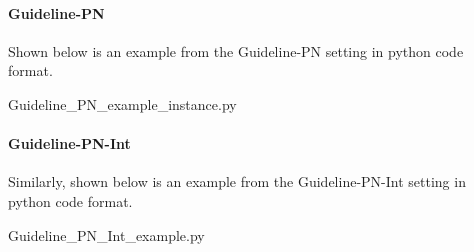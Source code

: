 \paragraph{Guideline-PN}
Shown below is an example from the Guideline-PN setting in python code format.
\vspace{10pt} %

{Guideline_PN_example_instance.py}

\paragraph{Guideline-PN-Int}
Similarly, shown below is an example from the Guideline-PN-Int setting in python code format.
\vspace{10pt} %

{Guideline_PN_Int_example.py}
\twocolumn


